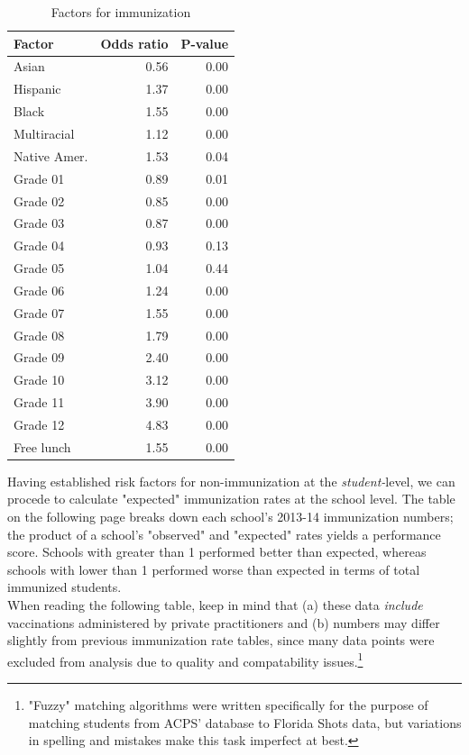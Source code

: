 \begin{multicols}{2}
\vfill
\columnbreak


\begin{table}[H]
\begin{table}[ht]
\centering
{\small
\begin{tabular}{lrr}
  \hline
Factor & Odds ratio & P-value \\ 
  \hline
Asian & 0.56 & 0.00 \\ 
  Hispanic & 1.37 & 0.00 \\ 
  Black & 1.55 & 0.00 \\ 
  Multiracial & 1.12 & 0.00 \\ 
  Native Amer. & 1.53 & 0.04 \\ 
  Grade 01 & 0.89 & 0.01 \\ 
  Grade 02 & 0.85 & 0.00 \\ 
  Grade 03 & 0.87 & 0.00 \\ 
  Grade 04 & 0.93 & 0.13 \\ 
  Grade 05 & 1.04 & 0.44 \\ 
  Grade 06 & 1.24 & 0.00 \\ 
  Grade 07 & 1.55 & 0.00 \\ 
  Grade 08 & 1.79 & 0.00 \\ 
  Grade 09 & 2.40 & 0.00 \\ 
  Grade 10 & 3.12 & 0.00 \\ 
  Grade 11 & 3.90 & 0.00 \\ 
  Grade 12 & 4.83 & 0.00 \\ 
  Free lunch & 1.55 & 0.00 \\ 
   \hline
\end{tabular}
}
\caption{Factors for immunization} 
\end{table}\end{table}


Having established risk factors for non-immunization at the \emph{student-}level, we can procede to calculate "expected" immunization rates at the school level.  The table on the following page breaks down each school's 2013-14 immunization numbers; the product of a school's "observed" and "expected" rates yields a performance score.  Schools with greater than 1 performed better than expected, whereas schools with lower than 1 performed worse than expected in terms of total immunized students.  \\

When reading the following table, keep in mind that (a) these data \emph{include} vaccinations administered by private practitioners and (b) numbers may differ slightly from previous immunization rate tables, since many data points were excluded from analysis due to quality and compatability issues.\footnote{"Fuzzy" matching algorithms were written specifically for the purpose of matching students from ACPS' database to Florida Shots data, but variations in spelling and mistakes make this task imperfect at best.}



\end{multicols}


